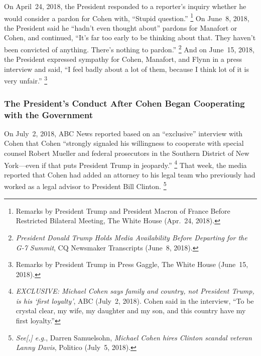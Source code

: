 On April~24, 2018, the President responded to a reporter's inquiry whether he would consider a pardon for Cohen with, ``Stupid question.''%
\footnote{Remarks by President Trump and President Macron of France Before Restricted Bilateral Meeting, The White House (Apr.~24, 2018).}
On June~8, 2018, the President said he ``hadn't even thought about'' pardons for Manafort or Cohen, and continued, ``It's far too early to be thinking about that.
They haven't been convicted of anything.
There's nothing to pardon.''%
\footnote{\textit{President Donald Trump Holds Media Availability Before Departing for the G-7 Summit}, CQ Newsmaker Transcripts (June~8, 2018).}
And on June~15, 2018, the President expressed sympathy for Cohen, Manafort, and Flynn in a press interview and said, ``I feel badly about a lot of them, because I think lot of it is very unfair.''%
\footnote{Remarks by President Trump in Press Gaggle, The White House (June~15, 2018).}

\subsubsection{The President's Conduct After Cohen Began Cooperating with the Government}

On July~2, 2018, ABC News reported based on an ``exclusive'' interview with Cohen that Cohen ``strongly signaled his willingness to cooperate with special counsel Robert Mueller and federal prosecutors in the Southern District of New York---even if that puts President Trump in jeopardy.''%
\footnote{\textit{EXCLUSIVE: Michael Cohen says family and country, not President Trump, is his `first loyalty'}, ABC (July~2, 2018).
Cohen said in the interview, ``To be crystal clear, my wife, my daughter and my son, and this country have my first loyalty.''}
That week, the media reported that Cohen had added an attorney to his legal team who previously had worked as a legal advisor to President Bill Clinton.%
\footnote{\textit{See[,] e.g.}, Darren Samuelsohn, \textit{Michael Cohen hires Clinton scandal veteran Lanny Davis}, Politico (July~5, 2018).}

